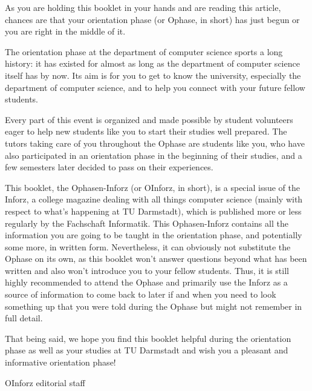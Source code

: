 {As you are holding this booklet in your hands and are reading this article, chances are that your orientation phase (or Ophase, in short) has just begun or you are right in the middle of it.}
{
    The orientation phase at the department of computer science sports a long history: it has existed for almost as long as the department of computer science itself has by now.
    Its aim is for you to get to know the university, especially the department of computer science, and to help you connect with your future fellow students.

    Every part of this event is organized and made possible by student volunteers eager to help new students like you to start their studies well prepared.
    The tutors taking care of you throughout the Ophase are students like you, who have also participated in an orientation phase in the beginning of their studies, and a few semesters later decided to pass on their experiences.

    This booklet, the Ophasen-Inforz (or OInforz, in short), is a special issue of the Inforz, a college magazine dealing with all things computer science (mainly with respect to what's happening at TU Darmstadt), which is published more or less regularly by the Fachschaft Informatik.
    This Ophasen-Inforz contains all the information you are going to be taught in the orientation phase, and potentially some more, in written form.
    Nevertheless, it can obviously not substitute the Ophase on its own, as this booklet won't answer questions beyond what has been written and also won't introduce you to your fellow students.
    Thus, it is still highly recommended to attend the Ophase and primarily use the Inforz as a source of information to come back to later if and when you need to look something up that you were told during the Ophase but might not remember in full detail.

    That being said, we hope you find this booklet helpful during the orientation phase as well as your studies at TU Darmstadt and wish you a pleasant and informative orientation phase!
}
{OInforz editorial staff}

